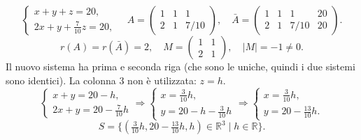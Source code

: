 \documentclass[11pt,a4paper]{article}
\newcommand{\pagina}[1]{\clearpage}
\begin{document}
\[\begin{cases}x+y+z=20,\\2x+y+\frac7{10}z=20,\end{cases}\quad A=\begin{pmatrix}1&1&1\\2&1&7/10\end{pmatrix},\quad\bar A=\begin{pmatrix}1&1&1&20\\2&1&7/10&20\end{pmatrix}.\]
\[r(A)=r(\bar A)=2,\quad M=\begin{pmatrix}1&1\\2&1\end{pmatrix},\quad |M|=-1\ne0.\]
Il nuovo sistema ha prima e seconda riga (che sono le uniche, quindi i due sistemi sono identici). La colonna 3 non è utilizzata: $z=h$.
\[\begin{cases}x+y=20-h,\\2x+y=20-\frac7{10}h\end{cases}\Rightarrow\begin{cases}x=\frac3{10}h,\\y=20-h-\frac3{10}h\end{cases}\Rightarrow\begin{cases}x=\frac3{10}h,\\y=20-\frac{13}{10}h.\end{cases}\]
\[S=\{(\tfrac3{10}h,20-\tfrac{13}{10}h,h)\in\mathbb R^3\mid h\in\mathbb R\}.\]
\pagina{27}
\end{document}
